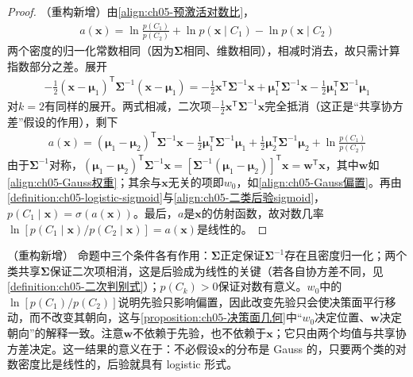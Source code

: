 \documentclass[../../main.tex]{subfiles}
\begin{document}
\begin{proof}
（重构新增）由\eqref{align:ch05-预激活对数比}，
\begin{align}
  a(\boldsymbol{x})=\ln\frac{p(C_1)}{p(C_2)}+\ln p(\boldsymbol{x}\mid C_1)-\ln p(\boldsymbol{x}\mid C_2)
\end{align}
两个密度的归一化常数相同（因为$\boldsymbol{\Sigma}$相同、维数相同），相减时消去，故只需计算指数部分之差。展开
\begin{align}
  -\frac{1}{2}(\boldsymbol{x}-\boldsymbol{\mu}_1)^{\mathsf{T}}\boldsymbol{\Sigma}^{-1}(\boldsymbol{x}-\boldsymbol{\mu}_1)
  =-\frac{1}{2}\boldsymbol{x}^{\mathsf{T}}\boldsymbol{\Sigma}^{-1}\boldsymbol{x}+\boldsymbol{\mu}_1^{\mathsf{T}}\boldsymbol{\Sigma}^{-1}\boldsymbol{x}-\frac{1}{2}\boldsymbol{\mu}_1^{\mathsf{T}}\boldsymbol{\Sigma}^{-1}\boldsymbol{\mu}_1
\end{align}
对$k=2$有同样的展开。两式相减，二次项$-\frac{1}{2}\boldsymbol{x}^{\mathsf{T}}\boldsymbol{\Sigma}^{-1}\boldsymbol{x}$完全抵消（这正是“共享协方差”假设的作用），剩下
\begin{align}
  a(\boldsymbol{x})=(\boldsymbol{\mu}_1-\boldsymbol{\mu}_2)^{\mathsf{T}}\boldsymbol{\Sigma}^{-1}\boldsymbol{x}-\frac{1}{2}\boldsymbol{\mu}_1^{\mathsf{T}}\boldsymbol{\Sigma}^{-1}\boldsymbol{\mu}_1+\frac{1}{2}\boldsymbol{\mu}_2^{\mathsf{T}}\boldsymbol{\Sigma}^{-1}\boldsymbol{\mu}_2+\ln\frac{p(C_1)}{p(C_2)}
\end{align}
由于$\boldsymbol{\Sigma}^{-1}$对称，$(\boldsymbol{\mu}_1-\boldsymbol{\mu}_2)^{\mathsf{T}}\boldsymbol{\Sigma}^{-1}\boldsymbol{x}=[\boldsymbol{\Sigma}^{-1}(\boldsymbol{\mu}_1-\boldsymbol{\mu}_2)]^{\mathsf{T}}\boldsymbol{x}=\boldsymbol{w}^{\mathsf{T}}\boldsymbol{x}$，其中$\boldsymbol{w}$如\eqref{align:ch05-Gauss权重}；其余与$\boldsymbol{x}$无关的项即$w_0$，如\eqref{align:ch05-Gauss偏置}。再由\cref{definition:ch05-logistic-sigmoid}与\eqref{align:ch05-二类后验sigmoid}，$p(C_1\mid\boldsymbol{x})=\sigma(a(\boldsymbol{x}))$。最后，$a$是$\boldsymbol{x}$的仿射函数，故对数几率$\ln[p(C_1\mid\boldsymbol{x})/p(C_2\mid\boldsymbol{x})]=a(\boldsymbol{x})$是线性的。
\end{proof}

\begin{remark}（重构新增）
命题中三个条件各有作用：$\boldsymbol{\Sigma}$正定保证$\boldsymbol{\Sigma}^{-1}$存在且密度归一化；两个类共享$\boldsymbol{\Sigma}$保证二次项相消，这是后验成为线性的关键（若各自协方差不同，见\cref{definition:ch05-二次判别式}）；$p(C_k)>0$保证对数有意义。$w_0$中的$\ln[p(C_1)/p(C_2)]$说明先验只影响偏置，因此改变先验只会使决策面平行移动，而不改变其朝向，这与\cref{proposition:ch05-决策面几何}中“$w_0$决定位置、$\boldsymbol{w}$决定朝向”的解释一致。注意$\boldsymbol{w}$不依赖于先验，也不依赖于$\boldsymbol{x}$；它只由两个均值与共享协方差决定。这一结果的意义在于：不必假设$\boldsymbol{x}$的分布是 Gauss 的，只要两个类的对数密度比是线性的，后验就具有 logistic 形式。
\end{remark}
\end{document}
